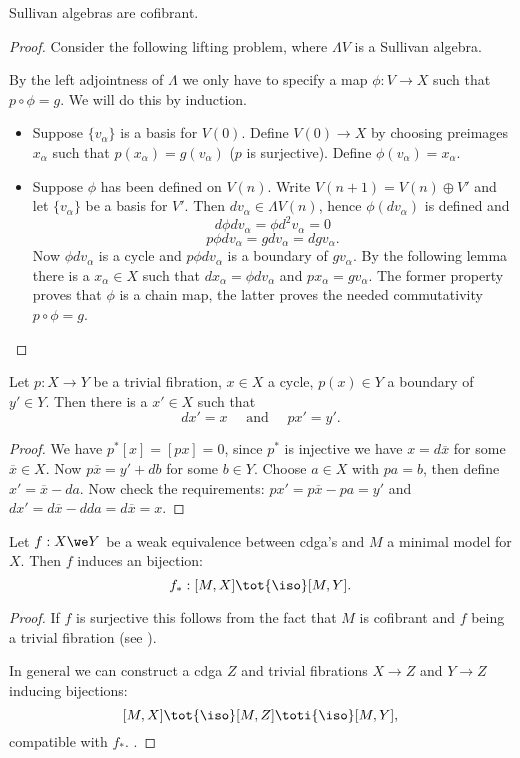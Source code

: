 \begin{lemma}
	Sullivan algebras are cofibrant.
\end{lemma}
\begin{proof}
	Consider the following lifting problem, where $\Lambda V$ is a Sullivan algebra.


	By the left adjointness of $\Lambda$ we only have to specify a map $\phi: V \to X$ such that $p \circ \phi = g$. We will do this by induction.
	\begin{itemize}
		\item Suppose $\{v_\alpha\}$ is a basis for $V(0)$. Define $V(0) \to X$ by choosing preimages $x_\alpha$ such that $p(x_\alpha) = g(v_\alpha)$ ($p$ is surjective). Define $\phi(v_\alpha) = x_\alpha$.
		\item Suppose $\phi$ has been defined on $V(n)$. Write $V(n+1) = V(n) \oplus V'$ and let $\{v_\alpha\}$ be a basis for $V'$. Then $dv_\alpha \in \Lambda V(n)$, hence $\phi(dv_\alpha)$ is defined and
		$$ d \phi d v_\alpha = \phi d^2 v_\alpha = 0 $$
		$$ p \phi d v_\alpha = g d v_\alpha = d g v_\alpha. $$
		Now $\phi d v_\alpha$ is a cycle and $p \phi d v_\alpha$ is a boundary of $g v_\alpha$. By the following lemma there is a $x_\alpha \in X$ such that $d x_\alpha = \phi d v_\alpha$ and $p x_\alpha = g v_\alpha$. The former property proves that $\phi$ is a chain map, the latter proves the needed commutativity $p \circ \phi = g$.
	\end{itemize}
\end{proof}

\begin{lemma}
	Let $p: X \to Y$ be a trivial fibration, $x \in X$ a cycle, $p(x) \in Y$ a boundary of $y' \in Y$. Then there is a $x' \in X$ such that
	$$ dx' = x \quad\text{ and }\quad px' = y'. $$
\end{lemma}
\begin{proof}
	We have $p^\ast [x] = [px] = 0$, since $p^\ast$ is injective we have $x = d \overline{x}$ for some $\overline{x} \in X$. Now $p \overline{x} = y' + db$ for some $b \in Y$. Choose $a \in X$ with $p a = b$, then define $x' = \overline{x} - da$. Now check the requirements: $p x' = p \overline{x} - p a = y'$ and $d x' = d \overline{x} - d d a = d \overline{x} = x$.
\end{proof}

\begin{lemma}
	Let $f: X \we Y$ be a weak equivalence between cdga's and $M$ a minimal model for $X$. Then $f$ induces an bijection:
	$$ f_\ast: [M, X] \tot{\iso} [M, Y]. $$
\end{lemma}
\begin{proof}
	If $f$ is surjective this follows from the fact that $M$ is cofibrant and $f$ being a trivial fibration (see \cite[lemma 4.9]{dwyer}).

	In general we can construct a cdga $Z$ and trivial fibrations $X \to Z$ and $Y \to Z$ inducing bijections:
	$$ [M, X] \tot{\iso} [M, Z] \toti{\iso} [M, Y], $$
	compatible with $f_\ast$. \cite[Proposition 12.9]{felix}.
\end{proof}

